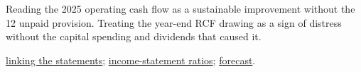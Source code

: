 \begin{qfexample}
 Reading the 2025 operating cash flow as a sustainable improvement without the 12 unpaid provision. Treating the year-end RCF drawing as a sign of distress without the capital spending and dividends that caused it.

 \hyperref[meth:statement-linked-cash-flows]{linking the statements}; \hyperref[meth:income-statement-ratios]{income-statement ratios}; \hyperref[ex:harbour-pro-forma-model]{forecast}.

\end{qfexample}
